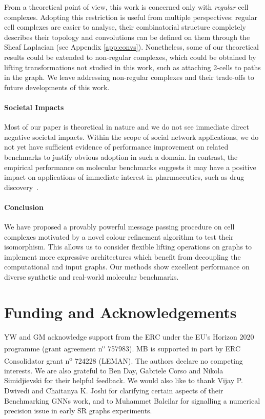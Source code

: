 \documentclass{article}
\begin{document}
From a theoretical point of view, this work is concerned only with \emph{regular} cell complexes. Adopting this restriction is useful from multiple perspectives: regular cell complexes are easier to analyse, their combinatorial structure completely describes their topology and convolutions can be defined on them through the Sheaf Laplacian (see Appendix \ref{app:convs}). Nonetheless, some of our theoretical results could be extended to non-regular complexes, which could be obtained by lifting transformations not studied in this work, such as attaching 2-cells to paths in the graph. We leave addressing non-regular complexes and their trade-offs to future developments of this work.   

\paragraph{Societal Impacts} Most of our paper is theoretical in 
nature and we do not see immediate direct negative societal impacts. Within the scope of social network applications, we do not yet have sufficient evidence of performance improvement on related benchmarks to justify obvious adoption in such a domain. In contrast, the empirical performance on molecular benchmarks suggests it may have a positive impact on applications of immediate interest in pharmaceutics, such as drug discovery~\citep{drug_discovery}.



\paragraph{Conclusion} We have proposed a provably powerful message passing procedure on cell complexes motivated by a novel colour refinement algorithm to test their isomorphism. This allows us to consider flexible lifting operations on graphs to implement more expressive architectures which benefit from decoupling the computational and input graphs. Our methods show excellent performance on diverse synthetic and real-world molecular benchmarks. 

\section*{Funding and Acknowledgements}

YW and GM acknowledge support from the ERC under the EU's Horizon 2020 programme (grant agreement n\textsuperscript{o} 757983). MB is supported in part by ERC Consolidator grant n\textsuperscript{o} 724228 (LEMAN). The authors declare no competing interests. We are also grateful to Ben Day, Gabriele Corso and Nikola Simidjievski for their helpful feedback. We would also like to thank Vijay P. Dwivedi and Chaitanya K. Joshi for clarifying certain aspects of their Benchmarking GNNs \citep{dwivedi2020benchmarkgnns} work, and to Muhammet Balcilar for signalling a numerical precision issue in early SR graphs experiments. 
\end{document}

